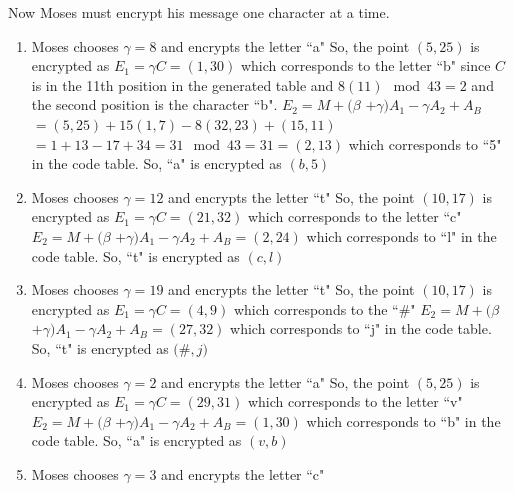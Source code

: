 \begin{eg}
\begin{flushleft}
Now Moses must encrypt his message one character at a time.
\end{flushleft}
\begin{enumerate}[(1)] 
\item Moses chooses $\gamma$$ = 8$ and encrypts the letter ``a" \newline
	So, the point $(5, 25)$ is encrypted as\newline
	$E_1 = $$\gamma$$C = (1, 30)$ which corresponds to the letter ``b" since $C$ is in the 11th position in the generated table and $8(11)\mod 43 = 2$ and the second position is the character ``b". \newline
	$E_2 = M +($$\beta$ $+$$\gamma$$)$$A_1 -$$\gamma$$A_2 + A_B$ \newline
	$= (5, 25) + 15(1, 7) - 8(32, 23) + (15, 11)$ \newline
	$= 1 + 13 - 17 + 34 = 31\mod43 = 31 = (2, 13)$ which corresponds to ``5" in the code table.  So, ``a" is encrypted as $(b, 5)$
\item Moses chooses $\gamma$$ = 12$ and encrypts the letter ``t" \newline
	So, the point $(10, 17)$ is encrypted as\newline
	$E_1 = $$\gamma$$C = (21, 32)$ which corresponds to the letter ``c"\newline
	$E_2 = M +($$\beta$ $+$$\gamma$$)$$A_1 -$$\gamma$$A_2 + A_B = (2, 24)$ which corresponds to ``l" in the code table.  So, ``t" is encrypted as $(c, l)$
\item Moses chooses $\gamma$$ = 19$ and encrypts the letter ``t" \newline
	So, the point $(10, 17)$ is encrypted as\newline
	$E_1 = $$\gamma$$C = (4, 9)$ which corresponds to the ``$\#$"\newline
	$E_2 = M +($$\beta$ $+$$\gamma$$)$$A_1 -$$\gamma$$A_2 + A_B = (27, 32)$ which corresponds to ``j" in the code table.  So, ``t" is encrypted as $($$\#$$, j)$
\item Moses chooses $\gamma$$ = 2$ and encrypts the letter ``a" \newline
	So, the point $(5, 25)$ is encrypted as\newline
	$E_1 = $$\gamma$$C = (29, 31)$ which corresponds to the letter ``v"\newline
	$E_2 = M +($$\beta$ $+$$\gamma$$)$$A_1 -$$\gamma$$A_2 + A_B = (1, 30)$ which corresponds to ``b" in the code table.  So, ``a" is encrypted as $(v, b)$
\item Moses chooses $\gamma$$ = 3$ and encrypts the letter ``c" \newline
$$
\end{enumerate}
\end{eg}
